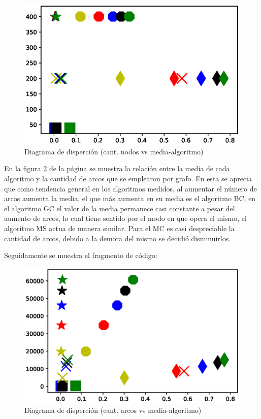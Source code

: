 \documentclass{article}
\begin{document}


\begin{figure}[h]
    \centering
    \includegraphics[scale=0.6]{Imagenes/Fig2.eps}
    \caption{Diagrama de disperción (cant. nodos vs media-algoritmo)}
    \label{fig:Fig2}
\end{figure}

En la figura \ref{fig:Fig3} de la página \pageref{fig:Fig3} se muestra la relación entre la media de cada algoritmo y la cantidad de arcos que se emplearon por grafo. En esta se aprecia que como tendencia general en los algoritmos medidos, al aumentar el número de arcos aumenta la media, el que más aumenta en su media es el algoritmo BC, en el algoritmo GC el valor de la media permanece casi constante a pesar del aumento de arcos, lo cual tiene sentido por el modo en que opera el mismo, el algoritmo MS actua de manera similar. Para el MC es casi despreciable la cantidad de arcos, debido a la demora del mismo se decidió disminuirlos.

Seguidamente se muestra el fragmento de código:



\begin{figure}[h]
    \centering
    \includegraphics[scale=0.6]{Imagenes/Fig3.eps}
    \caption{Diagrama de disperción (cant. arcos vs media-algoritmo)}
    \label{fig:Fig3}
\end{figure}
    



\end{document}
